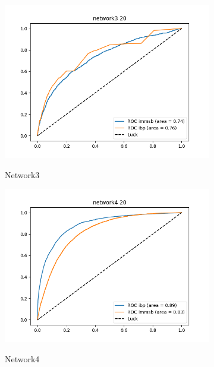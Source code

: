 \begin{figure}[h]
        \begin{subfigure}[b]{0.300\textwidth}
            \centering
            \includegraphics[width=\textwidth]{img/corpus/roc_network3_20}
            \label{fig:mean and std of net14}
            \caption {{\small Network3}}    
        \end{subfigure}
        \begin{subfigure}[b]{0.300\textwidth}
            \centering
            \includegraphics[width=\textwidth]{img/corpus/roc_network4_20}
            \label{fig:mean and std of net14}
            \caption {{\small Network4}}    
        \end{subfigure}
        \begin{subfigure}[b]{0.300\textwidth}

\end{subfigure}
\end{figure}
